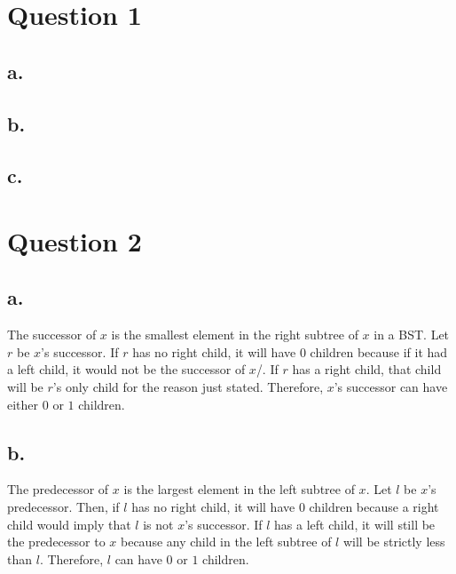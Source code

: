 \documentclass[12pt]{article}
\begin{document}
\pagestyle{fancy}


\section{Question 1}



\subsection{a.}
\subsection{b.}
\subsection{c.}

\section{Question 2}

\subsection{a.}

The successor of $x$ is the smallest element in the right subtree of $x$ in a BST. Let $r$ be $x$'s successor. If $r$ has no right child, it will have $0$ children because if it had a left child, it would not be the successor of $x$/. If $r$ has a right child, that child will be $r$'s only child for the reason just stated. Therefore, $x$'s successor can have either $0$ or $1$ children.

\subsection{b.}

The predecessor of $x$ is the largest element in the left subtree of $x$. Let $l$ be $x$'s predecessor. Then, if $l$ has no right child, it will have $0$ children because a right child would imply that $l$ is not $x$'s successor. If $l$ has a left child, it will still be the predecessor to $x$ because any child in the left subtree of $l$ will be strictly less than $l$. Therefore, $l$ can have $0$ or $1$ children.
\end{document}
